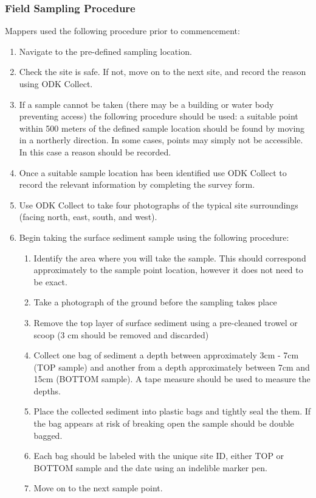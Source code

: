 \documentclass[a4paper,12pt,twoside]{article}
\begin{document}
\color{RHblue}
\subsubsection{Field Sampling Procedure}

\color{RHgrey}
Mappers used the following procedure prior to commencement:
\begin{enumerate}
\item Navigate to the pre-defined sampling location.
\item Check the site is safe. If not, move on to the next site, and record the reason using ODK Collect.
\item If a sample cannot be taken (there may be a building or water body preventing access) the following procedure should be used: a suitable point within 500 meters of the defined sample location should be found by moving in a northerly direction. In some cases, points may simply not be accessible. In this case a reason should be recorded.
\item Once a suitable sample location has been identified use ODK Collect to record the relevant information by completing the survey form.
\item Use ODK Collect to take four photographs of the typical site surroundings (facing north, east, south, and west).
\item Begin taking the surface sediment sample using the following procedure:
\begin{enumerate}
\item Identify the area where you will take the sample. This should correspond
approximately to the sample point location, however it does not need to be exact.
\item Take a photograph of the ground before the sampling takes place
\item Remove the top layer of surface sediment using a pre-cleaned trowel or scoop (3 cm should be removed and discarded)
\item Collect one bag of sediment a depth between approximately 3cm - 7cm (TOP sample) and another from a depth approximately between 7cm and 15cm (BOTTOM sample). A tape measure should be used to measure the depths.
\item Place the collected sediment into plastic bags and tightly seal the them. If the bag appears at risk of breaking open the sample should be double bagged.
\item Each bag should be labeled with the unique site ID, either TOP or BOTTOM sample and the date using an indelible marker pen.
\item Move on to the next sample point.
\end{enumerate}
\end{enumerate}
\end{document}
